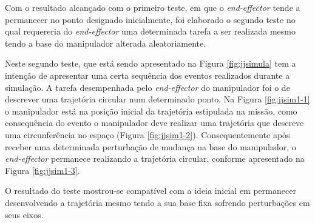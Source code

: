 Com o resultado alcançado com o primeiro teste, em que o \textit{end-effector} tende a permanecer no ponto designado inicialmente, foi elaborado o segundo teste no qual requereria do \textit{end-effector} uma determinada tarefa a ser realizada mesmo tendo a base do manipulador alterada aleatoriamente.

Neste segundo teste, que está sendo apresentado na Figura \ref{fig:jjsimula} tem a intenção de apresentar uma certa sequência dos eventos realizados durante a simulação.
A tarefa desempenhada pelo \textit{end-effector} do manipulador foi o de descrever uma trajetória circular num determinado ponto.
Na Figura \ref{fig:jjsim1-1} o manipulador está na posição inicial da trajetória estipulada na missão, como consequência do evento o manipulador deve realizar uma trajetória que descreve uma circunferência no espaço (Figura \ref{fig:jjsim1-2}). Consequentemente após receber uma determinada perturbação de mudança na base do manipulador, o \textit{end-effector} permanece realizando a trajetória circular, conforme apresentado na Figura \ref{fig:jjsim1-3}.

O resultado do teste mostrou-se compatível com a ideia inicial em permanecer desenvolvendo a trajetória mesmo tendo a sua base fixa sofrendo perturbações em seus eixos.

